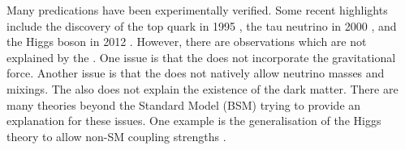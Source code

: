 Many \SM predications have been experimentally verified. Some recent highlights include the discovery of the top quark in 1995 \cite{Abachi:1995iq}, the tau neutrino in 2000 \cite{Kodama:2000mp}, and the Higgs boson in 2012 \cite{Aad:2012tfa,Chatrchyan:2012ufa}. However, there are observations which are not explained by the \SM. One issue is that the \SM does not incorporate the gravitational force. Another issue is that the \SM does not natively allow neutrino masses and mixings. The \SM also does not explain the existence of the dark matter. There are many theories beyond the Standard Model (BSM) trying to provide an explanation for these issues. One example is the generalisation of the Higgs theory to allow non-SM coupling strengths \cite{Kaplan:1983fs,Goldberger:2008zz}.

